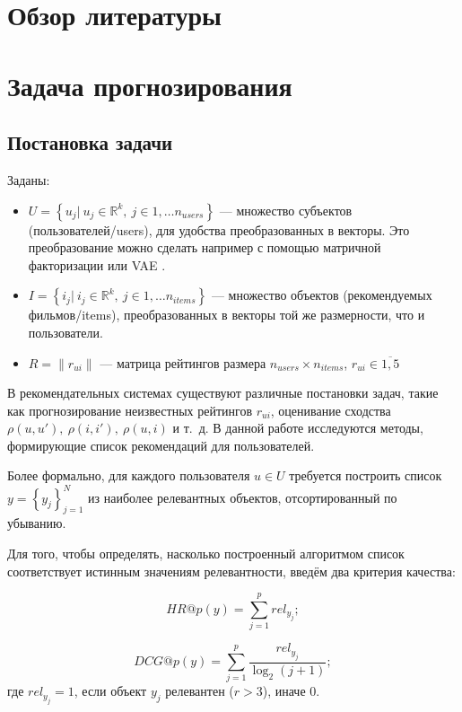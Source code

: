 \documentclass[14pt]{extarticle}
\begin{document}
\newpage

\section{Обзор литературы}

\newpage

\section{Задача прогнозирования}

\subsection{Постановка задачи}

Заданы:
\begin{itemize}

    \item $U = \left\{ u_j|\ u_j \in \mathbb{R}^k,\ j \in 1,\dots n_{users} \right\}$ --- множество субъектов (пользователей/users), для удобства преобразованных в векторы. Это преобразование можно сделать например с помощью матричной факторизации или VAE \cite{vae}.
    \item $I = \left\{ i_j|\ i_j \in \mathbb{R}^k,\ j \in 1,\dots n_{items} \right\}$ --- множество объектов (рекомендуемых фильмов/items), преобразованных в векторы той же размерности, что и пользователи.
    \item $R = \| r_{ui}\|$ --- матрица рейтингов размера $n_{users}\times n_{items}$, $r_{ui}\in \overline{1, 5}$

\end{itemize}

В рекомендательных системах существуют различные постановки задач, такие как прогнозирование неизвестных рейтингов $r_{ui}$, оценивание сходства $\rho (u, u'),\ \rho (i, i'),\ \rho (u, i)$ и т.~д. В данной работе исследуются методы, формирующие список рекомендаций для пользователей.

Более формально, для каждого пользователя $u\in U$ требуется построить список $y = \left\{y_j\right\}_{j=1}^{N}$ из наиболее релевантных объектов, отсортированный по убыванию.

Для того, чтобы определять, насколько построенный алгоритмом список соответствует истинным значениям релевантности, введём два критерия качества:

$$HR@p(y)=\sum\limits_{j=1}^{p} rel_{y_j};$$

$$DCG@p(y)= \sum\limits _{{j=1}}^{{p}}{\frac  {rel_{y_j}}{\log _{{2}}(j+1)}};$$
где $rel_{y_j}=1$, если объект $y_j$ релевантен ($r>3$), иначе 0.
\end{document}
